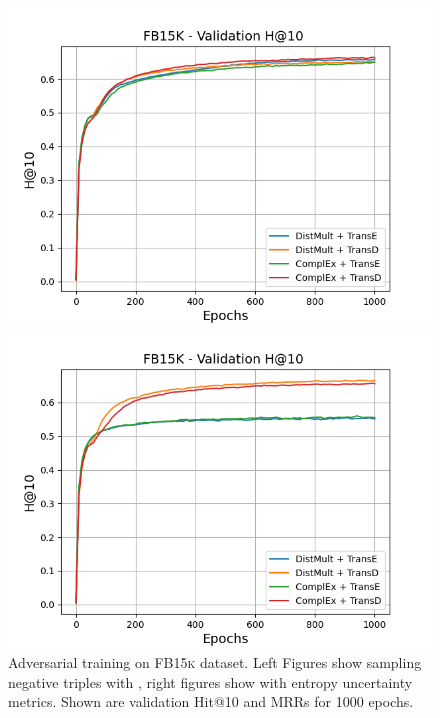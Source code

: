 \begin{figure}[H]
\begin{minipage}{.5\textwidth}
    \end{minipage}
    \begin{minipage}{.5\textwidth}
      \centering
      \includegraphics[width=0.9\linewidth]{figures/results/gan_train/not_pretrained/random/fb15k/1k_epochs/random_fb15k_hit10.png}
    \end{minipage}%
    \begin{minipage}{.5\textwidth}
      \centering
      \includegraphics[width=0.9\linewidth]{figures/results/gan_train/not_pretrained/uncertainty/max_distribution/entropy/fb15k/1k_epochs/uncertainty_fb15k_hit10.png}
    \end{minipage}%
    \caption{Adversarial training on \textsc{FB15k} dataset. 
    Left Figures show sampling negative triples with \origsampling, right figures show \ussoftmax with entropy uncertainty metrics.
    Shown are validation Hit@10 and MRRs for 1000 epochs.}
    \label{fig:advtrain_fb15k_random_vs_uncertainty}
\end{figure}

